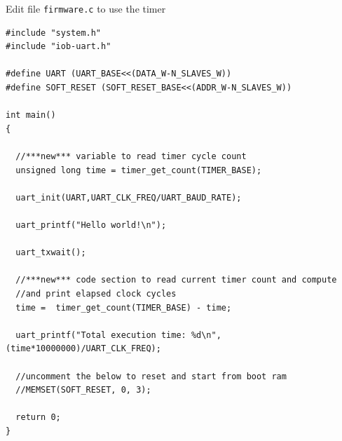 \documentclass [xcolor=svgnames, t] {beamer}
\begin{document}
\begin{frame}[fragile]{Edit file {\tt firmware.c} to use the timer}
\begin{tiny}
\begin{lstlisting}
#include "system.h"
#include "iob-uart.h"

#define UART (UART_BASE<<(DATA_W-N_SLAVES_W))
#define SOFT_RESET (SOFT_RESET_BASE<<(ADDR_W-N_SLAVES_W))

int main()
{ 

  //***new*** variable to read timer cycle count
  unsigned long time = timer_get_count(TIMER_BASE);
  
  uart_init(UART,UART_CLK_FREQ/UART_BAUD_RATE);   

  uart_printf("Hello world!\n");

  uart_txwait();
  
  //***new*** code section to read current timer count and compute 
  //and print elapsed clock cycles
  time =  timer_get_count(TIMER_BASE) - time;

  uart_printf("Total execution time: %d\n", (time*10000000)/UART_CLK_FREQ);
                          
  //uncomment the below to reset and start from boot ram
  //MEMSET(SOFT_RESET, 0, 3);

  return 0;
}
\end{lstlisting}
\end{tiny}
\end{frame}
\end{document}
